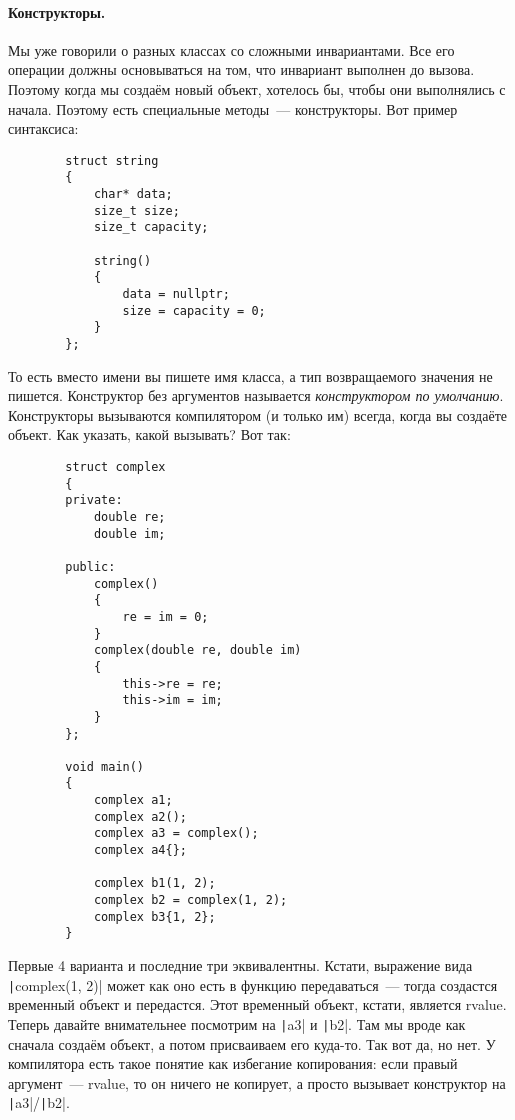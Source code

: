 \documentclass{article}
\begin{document}
    \paragraph{Конструкторы.}
    Мы уже говорили о разных классах со сложными инвариантами. Все его операции должны основываться на том, что инвариант выполнен до вызова. Поэтому когда мы создаём новый объект, хотелось бы, чтобы они выполнялись с начала. Поэтому есть специальные методы~--- конструкторы. Вот пример синтаксиса:
    \begin{verbatim}
        struct string
        {
            char* data;
            size_t size;
            size_t capacity;

            string()
            {
                data = nullptr;
                size = capacity = 0;
            }
        };
    \end{verbatim}
    То есть вместо имени вы пишете имя класса, а тип возвращаемого значения не пишется. Конструктор без аргументов называется \textit{конструктором по умолчанию}. Конструкторы вызываются компилятором (и только им) всегда, когда вы создаёте объект. Как указать, какой вызывать? Вот так:
    \begin{verbatim}
        struct complex
        {
        private:
            double re;
            double im;

        public:
            complex()
            {
                re = im = 0;
            }
            complex(double re, double im)
            {
                this->re = re;
                this->im = im;
            }
        };

        void main()
        {
            complex a1;
            complex a2();
            complex a3 = complex();
            complex a4{};

            complex b1(1, 2);
            complex b2 = complex(1, 2);
            complex b3{1, 2};
        }
    \end{verbatim}
    Первые 4 варианта и последние три эквивалентны. Кстати, выражение вида \texttt|complex(1, 2)| может как оно есть в функцию передаваться~--- тогда создастся временный объект и передастся. Этот временный объект, кстати, является rvalue. Теперь давайте внимательнее посмотрим на \texttt|a3| и \texttt|b2|. Там мы вроде как сначала создаём объект, а потом присваиваем его куда-то. Так вот да, но нет. У компилятора есть такое понятие как избегание копирования: если правый аргумент~--- rvalue, то он ничего не копирует, а просто вызывает конструктор на \texttt|a3|/\texttt|b2|.\\
\end{document}
